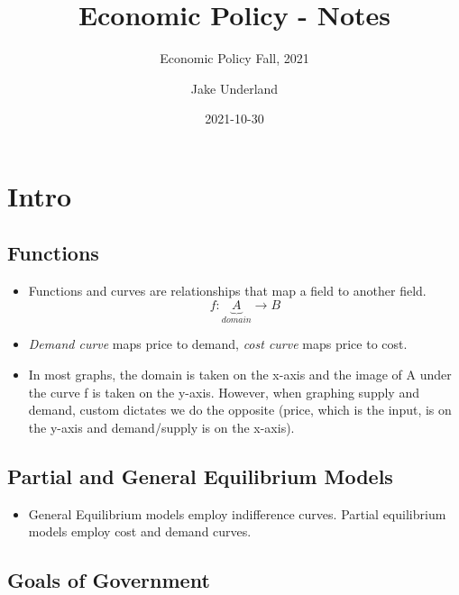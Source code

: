 \documentclass[
]{ltjarticle}
\title{Economic Policy - Notes}
\subtitle{Economic Policy Fall, 2021}
\author{Jake Underland}
\date{2021-10-30}
\providecommand{\tightlist}{%
  \setlength{\itemsep}{0pt}\setlength{\parskip}{0pt}}
\begin{document}
\maketitle

{
\setcounter{tocdepth}{3}
\tableofcontents
}
\hypertarget{intro}{%
\section{Intro}\label{intro}}

\hypertarget{functions}{%
\subsection{Functions}\label{functions}}

\begin{itemize}
\item
  Functions and curves are relationships that map a field to another
  field. \[f:\underbrace{A}_\textit{domain} \to B\]
\item
  \emph{Demand curve} maps price to demand, \emph{cost curve} maps price
  to cost.
\item
  In most graphs, the domain is taken on the x-axis and the image of A
  under the curve f is taken on the y-axis. However, when graphing
  supply and demand, custom dictates we do the opposite (price, which is
  the input, is on the y-axis and demand/supply is on the x-axis).
\end{itemize}

\hypertarget{partial-and-general-equilibrium-models}{%
\subsection{Partial and General Equilibrium
Models}\label{partial-and-general-equilibrium-models}}

\begin{itemize}
\tightlist
\item
  General Equilibrium models employ indifference curves. Partial
  equilibrium models employ cost and demand curves.
\end{itemize}

\hypertarget{goals-of-government}{%
\subsection{Goals of Government}\label{goals-of-government}}
\end{document}
